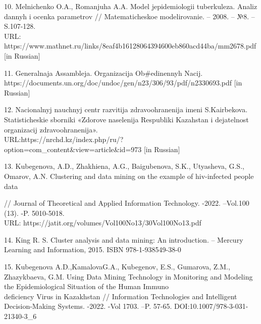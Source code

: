 \begin{noparindent}
10. Mel\textquotesingle nichenko O.A., Romanjuha A.A.
Model\textquotesingle{} jepidemiologii tuberkuleza. Analiz dannyh i
ocenka parametrov // Matematicheskoe modelirovanie. -- 2008. -- №8. --
S.107-128. \\URL:
https://www.mathnet.ru/links/8eaf4b16128064394600eb860acd44ba/mm2678.pdf
{[}in Russian{]}

11. General\textquotesingle naja Assambleja. Organizacija Ob\#edinennyh
Nacij.
\\https://documents.un.org/doc/undoc/gen/n23/306/93/pdf/n2330693.pdf {[}in
Russian{]}

12. Nacional\textquotesingle nyj nauchnyj centr razvitija
zdravoohranenija imeni S.Kairbekova. Statisticheskie sborniki
«Zdorov\textquotesingle e naselenija Respubliki Kazahstan i
dejatel\textquotesingle nost\textquotesingle{} organizacij
zdravoohranenija».
\\URL:https://nrchd.kz/index.php/ru/?option=com\_content\&view=article\&id=973
{[}in Russian{]}

13. Kubegenova, A.D., Zhakhiena, A.G., Baigubenova, S.K., Utyasheva,
G.S., Omarov, A.N. Clustering and data mining on the example of
hiv-infected people data

// Journal of Theoretical and Applied Information Technology. -2022.
--Vol.100 (13). -P. 5010-5018.\\ URL:
https://jatit.org/volumes/Vol100No13/30Vol100No13.pdf

14. King R. S. Cluster analysis and data mining: An introduction. --
Mercury Learning and Information, 2015. ISBN 978-1-938549-38-0

15. Kubegenova A.D.,KamalovaG.A., Kubegenov, E.S., Gumarova, Z.M.,
Zhazykbaeva, G.M. Using Data Mining Technology in Monitoring and
Modeling the Epidemiological Situation of the Human Immuno\\deficiency
Virus in Kazakhstan // Information Technologies and Intelligent
Decision-Making Systems. -2022. -Vol 1703. --P. 57-65.
DOI:10.1007/978-3-031-21340-3\_6
\end{noparindent}


